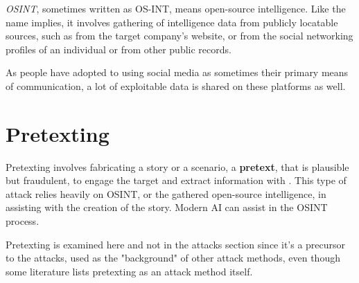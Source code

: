 \textit{OSINT}, sometimes written as OS-INT, means open-source intelligence. Like the name implies, it involves gathering of intelligence data from publicly locatable sources, such as from the target company's website, or from the social networking profiles of an individual or from other public records.

As people have adopted to using social media as sometimes their primary means of communication, a lot of exploitable data is shared on these platforms as well.




\section{Pretexting}
\begin{comment}

    - General info about what is pretexting
    - Fabricated scenario that is plausible but fraudulent
    - Originally used by FBI
    - Impersonation
    - Discussion about how modern AI can aid with pretexting is in the final chapter
    - Role in the deception-based SE attacks
    - Common pretexting tactics will be covered later
    - How AI powers up pretexting will be discussed later
        - How AI tech can be utilized to create more sophisticated and convincing pretexts
        - Examples of succesful pretexting attacks and their impacts
        - AI and automated pretexting attacks and their effectiveness
        - Analysis on pretexting evolving landscape with AI
    - Ethical considerations?
    - Countermeasures will be covered later also
        - How to identify and mitigate attempts
        - Recommendations for organiations to enhance their defenses against pretexting attacks
        
\end{comment}

Pretexting involves fabricating a story or a scenario, a \textbf{pretext}, that is plausible but fraudulent, to engage the target and extract information with \citep{contehCybersecurityRisksVulnerabilities2016}. This type of attack relies heavily on OSINT, or the gathered open-source intelligence, in assisting with the creation of the story. Modern AI can assist in the OSINT process.

Pretexting is examined here and not in the attacks section since it's a precursor to the attacks, used as the "background" of other attack methods, even though some literature lists pretexting as an attack method itself.

